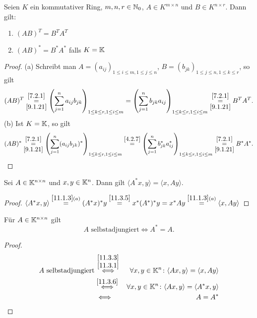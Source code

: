 \documentclass[../../main.tex]{subfiles}
\begin{document}
\begin{pro}\label{11.3.5}
Seien $K$ ein kommutativer Ring, $m,n,r\in\mathbb N_0$, $A\in K^{m\times n}$ und $B\in K^{n\times r}$. Dann gilt:
\begin{enumerate}[\rm(a)]
\item $(AB)^T=B^TA^T$
\item $(AB)^*=B^*A^*$ falls $K=\mathbb K$
\end{enumerate}
\end{pro}

\begin{proof}
(a) Schreibt man $A=(a_{ij})_{1\le i\le m,1\le j\le n}$, $B=(b_{jk})_{1\le j\le n,1\le k\le r}$, so gilt
\[(AB)^T\overset{\ref{7.2.1}}{\underset{\ref{9.1.21}}=}\left(\sum_{j=1}^na_{ij}b_{jk}\right)_{1\le k\le r,1\le i\le m}=\left(\sum_{j=1}^nb_{jk}a_{ij}\right)_{1\le k\le r,1\le i\le m}\overset{\ref{7.2.1}}{\underset{\ref{9.1.21}}=}B^TA^T.\]
(b) Ist $K=\mathbb K$, so gilt
\[(AB)^*\overset{\ref{7.2.1}}{\underset{\ref{9.1.21}}=}\left(\sum_{j=1}^n(a_{ij}b_{jk})^*\right)_{1\le k\le r,1\le i\le m}\overset{\ref{4.2.7}}=\left(\sum_{j=1}^nb_{jk}^*a_{ij}^*\right)_{1\le k\le r,1\le i\le m}\overset{\ref{7.2.1}}{\underset{\ref{9.1.21}}=}B^*A^*.\]
\end{proof}

\begin{lem}\label{11.3.6}
Sei $A\in\mathbb K^{n\times n}$ und $x,y\in\mathbb K^n$. Dann gilt $\langle A^*x,y\rangle=\langle x,Ay\rangle$.
\end{lem}

\begin{proof}
$\langle A^*x,y\rangle\overset{\ref{11.1.3}(a)}=(A^*x)^*y\overset{\ref{11.3.5}}=x^*(A^*)^*y=x^*Ay\overset{\ref{11.1.3}(a)}=\langle x,Ay\rangle$
\end{proof}

\begin{pro}\label{11.3.7}
Für $A\in\mathbb K^{n\times n}$ gilt
$$\text{$A$ selbstadjungiert}\iff A^*=A.$$
\end{pro}

\begin{proof}
\begin{eqnarray*}
\text{$A$ selbstadjungiert}&\overset{\over{\scriptstyle\ref{11.3.3}}{\scriptstyle\ref{11.3.1}}}\iff&\forall x,y\in\K^n\colon\langle Ax,y\rangle=\langle x,Ay\rangle\\
&\overset{\ref{11.3.6}}\iff&\forall x,y\in\K^n\colon\langle Ax,y\rangle=\langle A^*x,y\rangle\\
&\iff&A=A^*
\end{eqnarray*}
\end{proof}
\end{document}
